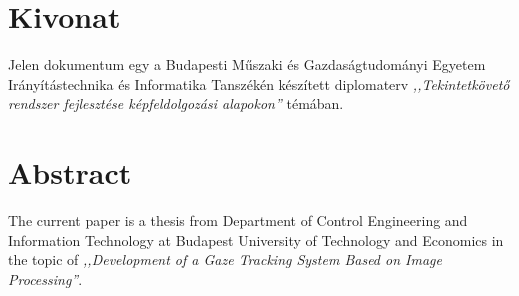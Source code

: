 \chapter*{Kivonat}

Jelen dokumentum egy a Budapesti Műszaki és Gazdaságtudományi Egyetem Irányítástechnika és Informatika Tanszékén készített diplomaterv \emph{,,Tekintetkövető rendszer fejlesztése képfeldolgozási alapokon''} témában. 


\newpage

\chapter*{Abstract}

The current paper is a thesis from Department of Control Engineering and Information Technology at Budapest University of Technology and Economics in the topic of \emph{,,Development of a Gaze Tracking System Based on Image Processing''}. 


\vfill
